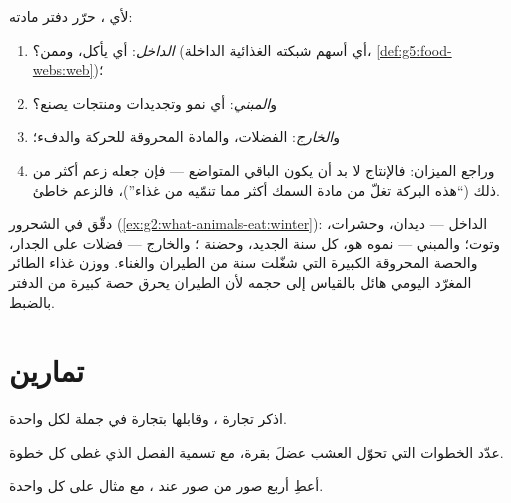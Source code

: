 \begin{method}\label{met:g6:matter-from-food:audit}
لأي ، حرّر دفتر مادته:
\begin{enumerate}
  \item \emph{الداخل}: أي  يأكل، وممن؟ (أي أسهم شبكته
        الغذائية الداخلة،
        \cref{def:g5:food-webs:web})؛
  \item و\emph{المبني}: أي نمو وتجديدات ومنتجات يصنع؟
  \item و\emph{الخارج}: الفضلات، والمادة المحروقة للحركة
        والدفء؛
  \item وراجع الميزان: فالإنتاج لا بد أن يكون الباقي المتواضع
        --- فإن جعله زعم أكثر من ذلك (``هذه البركة تغلّ من مادة
        السمك أكثر مما تنمّيه من غذاء'')، فالزعم خاطئ.
\end{enumerate}
\end{method}

\begin{example}\label{ex:g6:matter-from-food:audituse}
دقّق في الشحرور (\cref{ex:g2:what-animals-eat:winter}): الداخل ---
ديدان، وحشرات، وتوت؛ والمبني --- نموه هو،  كل سنة الجديد،
وحضنة ؛ والخارج --- فضلات على الجدار، والحصة المحروقة الكبيرة
التي شغّلت سنة من الطيران والغناء. ووزن غذاء الطائر المغرّد اليومي
هائل بالقياس إلى حجمه لأن الطيران يحرق حصة كبيرة من الدفتر بالضبط.
\end{example}

\section{تمارين}

\begin{exercise}[$\star$]\label{exo:g6:matter-from-food:1}
اذكر تجارة ، وقابلها بتجارة  في جملة لكل
واحدة.
\end{exercise}

\begin{exercise}[$\star$]\label{exo:g6:matter-from-food:2}
عدّد الخطوات التي تحوّل العشب عضلَ بقرة، مع تسمية الفصل الذي غطى
كل خطوة.
\end{exercise}

\begin{exercise}[$\star$]\label{exo:g6:matter-from-food:3}
أعطِ أربع صور من صور  عند ، مع مثال على كل
واحدة.
\end{exercise}

